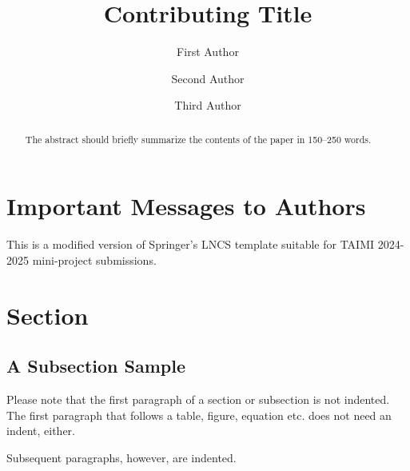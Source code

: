 \documentclass[runningheads]{llncs}
\begin{document}
%
\title{Contributing Title}
%
\author{First Author \and
Second Author \and
Third Author}
%
%



    
\maketitle              %
%
\begin{abstract}
The abstract should briefly summarize the contents of the paper in 150--250 words. 


\end{abstract}
%
%
%
\section{Important Messages to Authors}

This is a modified version of Springer's LNCS template suitable for TAIMI 2024-2025 mini-project submissions. 


\section{Section}
\subsection{A Subsection Sample}
Please note that the first paragraph of a section or subsection is
not indented. The first paragraph that follows a table, figure,
equation etc. does not need an indent, either.

Subsequent paragraphs, however, are indented.
\end{document}
